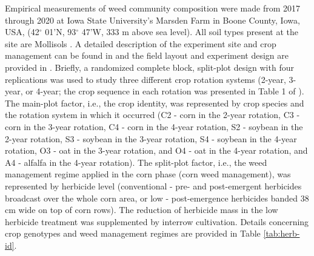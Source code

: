 \documentclass[
]{article}
\begin{document}
Empirical measurements of weed community composition were made from 2017 through 2020 at Iowa State University's Marsden Farm in Boone County, Iowa, USA, (42\(^\circ\) 01'N, 93\(^\circ\) 47'W, 333 m above sea level). All soil types present at the site are Mollisols \citep{chenInfluenceResidueNitrogen2014}. A detailed description of the experiment site and crop management can be found in \citet{liebmanWeedSeedbankDiversity2021} and the field layout and experiment design are provided in \citet{nguyenImpactCroppingSystemaccepted}. Briefly, a randomized complete block, split-plot design with four replications was used to study three different crop rotation systems (2-year, 3-year, or 4-year; the crop sequence in each rotation was presented in Table 1 of \citet{nguyenImpactCroppingSystemaccepted}). The main-plot factor, i.e., the crop identity, was represented by crop species and the rotation system in which it occurred (C2 - corn in the 2-year rotation, C3 - corn in the 3-year rotation, C4 - corn in the 4-year rotation, S2 - soybean in the 2-year rotation, S3 - soybean in the 3-year rotation, S4 - soybean in the 4-year rotation, O3 - oat in the 3-year rotation, and O4 - oat in the 4-year rotation, and A4 - alfalfa in the 4-year rotation). The split-plot factor, i.e., the weed management regime applied in the corn phase (corn weed management), was represented by herbicide level (conventional - pre- and post-emergent herbicides broadcast over the whole corn area, or low - post-emergence herbicides banded 38 cm wide on top of corn rows). The reduction of herbicide mass in the low herbicide treatment was supplemented by interrow cultivation. Details concerning crop genotypes and weed management regimes are provided in Table \ref{tab:herb-id}.
\end{document}
